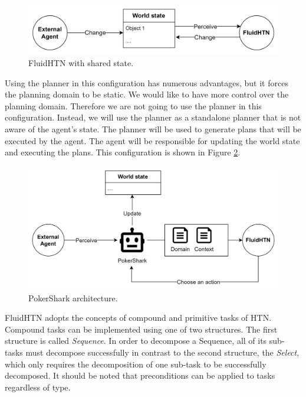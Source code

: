 \begin{figure}[h]
    \centering
    \includegraphics[width=\textwidth]{graphics/agent_3.png}
    \caption{FluidHTN with shared state.}
    \label{fig:agent}
\end{figure}

Using the planner in this configuration has numerous advantages, but it forces the planning domain to be static. We would like to have more control over the planning domain. Therefore we are not going to use the planner in this configuration. Instead, we will use the planner as a standalone planner that is not aware of the agent's state. The planner will be used to generate plans that will be executed by the agent. The agent will be responsible for updating the world state and executing the plans. This configuration is shown in Figure \ref{fig:PokerSharkArchitecture}.


\begin{figure}[h]
    \centering
    \includegraphics[width=\textwidth]{graphics/structure.png}
    \caption{PokerShark architecture.}
    \label{fig:PokerSharkArchitecture}
\end{figure}

FluidHTN adopts the concepts of compound and primitive tasks of HTN. Compound tasks can be implemented using one of two structures. The first structure is called \textit{Sequence}. In order to decompose a Sequence, all of its sub-tasks must decompose successfully in contrast to the second structure, the \textit{Select}, which only requires the decomposition of one sub-task to be successfully decomposed. It should be noted that preconditions can be applied to tasks regardless of type.


